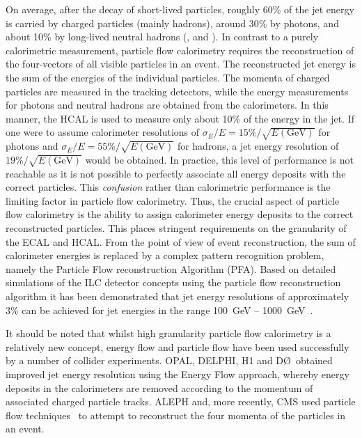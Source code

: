 On average, after the decay of short-lived particles, roughly 60\% of the jet
energy is carried by charged particles (mainly hadrons), around 30\% by
photons, and about 10\% by long-lived neutral hadrons (\eg \Pn, \PAn and
\PKL). In contrast to a purely calorimetric measurement, particle flow
calorimetry requires the reconstruction of the four-vectors of all visible
particles in an event. The reconstructed jet energy is the sum of the energies
of the individual particles. The momenta of charged particles are measured in
the tracking detectors, while the energy measurements for photons and neutral
hadrons are obtained from the calorimeters. In this manner, the HCAL is used to
measure only about 10\% of the energy in the jet. If one were to assume
calorimeter resolutions of $\sigma_E/E = 15\%/\sqrt{E\mathrm{(GeV)}}$ for photons
and $\sigma_E/E = 55\%/\sqrt{E\mathrm{(GeV)}}$ for hadrons, a jet energy resolution
of $19\%/\sqrt{E\mathrm{(GeV)}}$ would be obtained. In practice, this level of
performance is not reachable as it is not possible to perfectly associate all
energy deposits with the correct particles. This \textit{confusion} rather than
calorimetric performance is the limiting factor in particle flow calorimetry. Thus, the
crucial aspect of particle flow calorimetry is the ability to assign
calorimeter energy deposits to the correct reconstructed particles. This places
stringent requirements on the granularity of the \acs{ECAL} and \acs{HCAL}\@. From the point
of view of event reconstruction, the sum of calorimeter energies is replaced by
a complex pattern recognition problem, namely the Particle Flow reconstruction
Algorithm (PFA). Based on detailed simulations of the ILC detector concepts
using the \pandora particle flow reconstruction algorithm it has been
demonstrated that jet energy resolutions of approximately 3\% can be achieved for jet
energies in the range 100~GeV -- 1000~GeV~\cite{thomson:pandora,Marshall:2010}. 

It should be noted that whilst high granularity particle flow calorimetry is a
relatively new concept, energy flow and particle flow have been used
successfully by a number of collider experiments. \acs{OPAL}, \acs{DELPHI}, H1 and D\O\ obtained
improved jet energy resolution using the Energy Flow approach, whereby energy
deposits in the calorimeters are removed according to the momentum of
associated charged particle tracks. \acs{ALEPH} and, more recently, \acs{CMS} used particle
flow techniques~\cite{Aleph-jet,PFT-09-001,PFT-10-002,PFT-10-003} to attempt to reconstruct the four
momenta of the particles in an event. 

